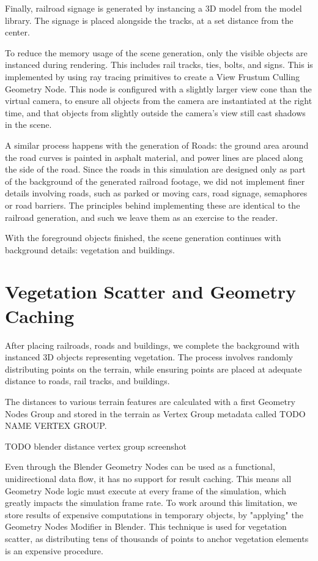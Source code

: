 Finally, railroad signage is generated by instancing a 3D model from the model library. The signage is placed alongside the tracks, at a set distance from the center.

To reduce the memory usage of the scene generation, only the visible objects are instanced during rendering. This includes rail tracks, ties, bolts, and signs. This is implemented by using ray tracing primitives to create a View Frustum Culling Geometry Node. This node is configured with a slightly larger view cone than the virtual camera, to ensure all objects from the camera are instantiated at the right time, and that objects from slightly outside the camera's view still cast shadows in the scene.


A similar process happens with the generation of Roads: the ground area around the road curves is painted in asphalt material, and power lines are placed along the side of the road. Since the roads in this simulation are designed only as part of the background of the generated railroad footage, we did not implement finer details involving roads, such as parked or moving cars, road signage, semaphores or road barriers. The principles behind implementing these are identical to the railroad generation, and such we leave them as an exercise to the reader.





With the foreground objects finished, the scene generation continues with background details: vegetation and buildings.

\section{Vegetation Scatter and Geometry Caching}
\label{sec:vegetation-scatter}

After placing railroads, roads and buildings, we complete the background with instanced 3D objects representing vegetation. The process involves randomly distributing points on the terrain, while ensuring points are placed at adequate distance to roads, rail tracks, and buildings. 

The distances to various terrain features are calculated with a first Geometry Nodes Group and stored in the terrain as Vertex Group metadata called TODO NAME VERTEX GROUP.

TODO blender distance vertex group screenshot

Even through the Blender Geometry Nodes can be used as a functional, unidirectional data flow, it has no support for result caching. This means all Geometry Node logic must execute at every frame of the simulation, which greatly impacts the simulation frame rate. To work around this limitation, we store results of expensive computations in temporary objects, by "applying" the Geometry Nodes Modifier in Blender. This technique is used for vegetation scatter, as distributing tens of thousands of points to anchor vegetation elements is an expensive procedure.

